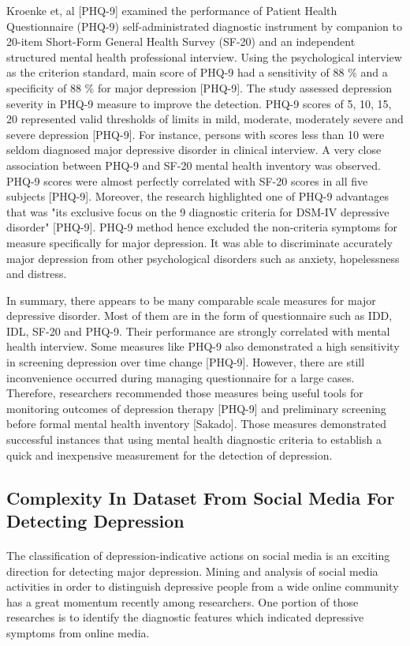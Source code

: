 \documentclass[runningheads]{llncs}
\begin{document}
Kroenke et, al [PHQ-9] examined the performance of Patient Health Questionnaire (PHQ-9) self-administrated diagnostic instrument by companion to 20-item Short-Form General Health Survey (SF-20) and an independent structured mental health professional interview. Using the psychological interview as the criterion standard, main score of PHQ-9 had a sensitivity of 88 \% and a specificity of 88 \% for major depression [PHQ-9]. The study assessed depression severity in PHQ-9 measure to improve the detection.  PHQ-9 scores of 5, 10, 15, 20 represented valid thresholds of limits in mild, moderate, moderately severe and severe depression [PHQ-9]. For instance, persons with scores less than 10 were seldom diagnosed major depressive disorder in clinical interview. A very close association between PHQ-9 and SF-20 mental health inventory was observed. PHQ-9 scores were almost perfectly correlated with SF-20 scores in all five subjects [PHQ-9]. Moreover, the research highlighted one of PHQ-9 advantages that was "its exclusive focus on the 9 diagnostic criteria for DSM-IV depressive disorder" [PHQ-9]. PHQ-9 method hence excluded the non-criteria symptoms for measure specifically for major depression. It was able to discriminate accurately major depression from other psychological disorders such as anxiety, hopelessness and distress.

In summary, there appears to be many comparable scale measures for major depressive disorder. Most of them are in the form of questionnaire such as IDD, IDL, SF-20 and PHQ-9. Their performance are strongly correlated with mental health interview. Some measures like PHQ-9 also demonstrated a high sensitivity in screening depression over time change [PHQ-9]. However, there are still inconvenience occurred during managing questionnaire for a large cases. Therefore, researchers recommended those measures being useful tools for monitoring outcomes of depression therapy [PHQ-9] and preliminary screening before formal mental health inventory [Sakado]. Those measures demonstrated successful instances that using mental health diagnostic criteria to establish a quick and inexpensive measurement for the detection of depression.
%
%
%
%
\subsection{Complexity In Dataset From Social Media For Detecting Depression}
%
%
\paragraph{}
The classification of depression-indicative actions on social media is an exciting direction for detecting major depression. Mining and analysis of social media activities in order to distinguish depressive people from a wide online community has a great momentum recently among researchers. One portion of those researches is to identify the diagnostic features which indicated depressive symptoms from online media.
\end{document}
